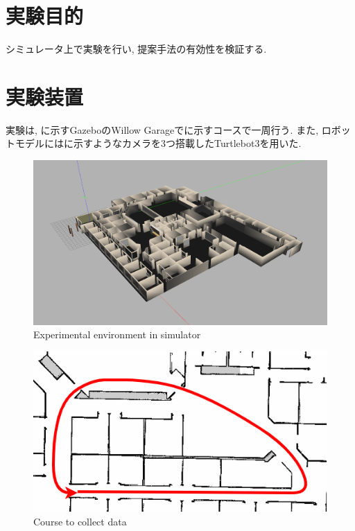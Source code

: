 
\section{実験目的}
シミュレータ上で実験を行い, 提案手法の有効性を検証する.

\section{実験装置}
実験は, に示すGazebo\cite{gazebo}のWillow Garage\cite{willow}でに示すコースで一周行う. また, ロボットモデルにはに示すようなカメラを3つ搭載したTurtlebot3\cite{turtlebot3}を用いた. 

\begin{figure}[h]
  \centering
  \includegraphics[keepaspectratio, scale=0.15]{images/gazebo.png}
  \caption{Experimental environment in simulator}
  \label{Fig:gazebo}
  \end{figure}

\newpage
\vspace{20mm}
\begin{figure}[h]
  \centering
  \includegraphics[keepaspectratio, scale=0.5]{images/willow-path.png}
  \caption{Course to collect data}
  \label{Fig:willow-garage}
  \end{figure}

